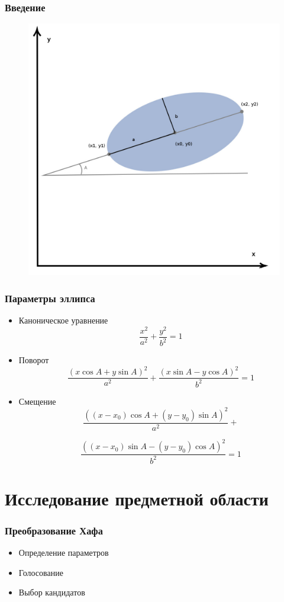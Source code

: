 \documentclass[14pt]{beamer}
\begin{document}
\begin{frame}
\frametitle{Введение}
\begin{figure}[H]
  \center
  \includegraphics[width=0.6\linewidth]{ellipseparametres}
\end{figure}
\end{frame}

\begin{frame}
\frametitle{Параметры эллипса}
\begin{itemize}
  \item Каноническое уравнение
  $$ \frac{x^2}{a^2} + \frac{y^2}{b^2} = 1 $$
  \item Поворот
  $$ \frac{(x\cos A + y\sin A)^2}{a^2} + \frac{(x\sin A - y\cos A)^2}{b^2} = 1 $$
  \item Смещение
  \small
  $$ \frac{((x - x_0)\cos A + (y - y_0)\sin A)^2}{a^2}  + $$
  
  $$ \frac{((x - x_0)\sin A - (y - y_0)\cos A)^2}{b^2} = 1 $$
  \normalsize
\end{itemize}
\end{frame}

\section{Исследование предметной области}
\begin{frame}
\frametitle{Преобразование Хафа}
\begin{itemize}
  \item Определение параметров
  \item Голосование
  \item Выбор кандидатов   
\end{itemize}
\end{frame}
\end{document}
